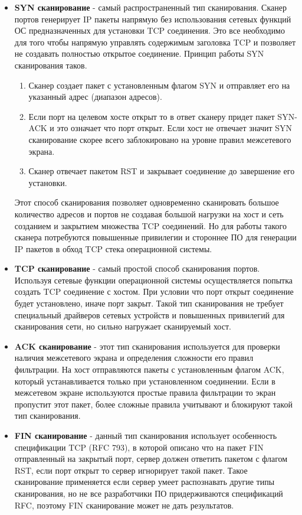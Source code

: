 \begin{itemize}
\item
  \textbf{SYN сканирование} - самый распространенный тип сканирования.
  Сканер портов генерирует IP пакеты напрямую без использования сетевых
  функций ОС предназначенных для установки TCP соединения. Это все
  необходимо для того чтобы напрямую управлять содержимым заголовка TCP
  и позволяет не создавать полностью открытое соединение. Принцип работы
  SYN сканирования таков.

  \begin{enumerate}
  \def\labelenumi{\arabic{enumi}.}
  \item
    Сканер создает пакет с установленным флагом SYN и отправляет его на
    указанный адрес (диапазон адресов).
  \item
    Если порт на целевом хосте открыт то в ответ сканеру придет пакет
    SYN-ACK и это означает что порт открыт. Если хост не отвечает значит
    SYN сканирование скорее всего заблокировано на уровне правил
    межсетевого экрана.
  \item
    Сканер отвечает пакетом RST и закрывает соединение до завершение его
    установки.
  \end{enumerate}

  Этот способ сканирования позволяет одновременно сканировать большое
  количество адресов и портов не создавая большой нагрузки на хост и
  сеть созданием и закрытием множества TCP соединений. Но для работы
  такого сканера потребуются повышенные привилегии и стороннее ПО для
  генерации IP пакетов в обход TCP стека операционной системы.
\item
  \textbf{TCP сканирование} - самый простой способ сканирования портов.
  Используя сетевые функции операционной системы осуществляется попытка
  создать TCP соединение с хостом. При условии что порт открыт
  соединение будет установлено, иначе порт закрыт. Такой тип
  сканирования не требует специальный драйверов сетевых устройств и
  повышенных привилегий для сканирования сети, но сильно нагружает
  сканируемый хост.
\item
  \textbf{ACK сканирование} - этот тип сканирования используется для
  проверки наличия межсетевого экрана и определения сложности его правил
  фильтрации. На хост отправляются пакеты с установленным флагом ACK,
  который устанавливается только при установленном соединении. Если в
  межсетевом экране используются простые правила фильтрации то экран
  пропустит этот пакет, более сложные правила учитывают и блокируют
  такой тип сканирования.
\item
  \textbf{FIN сканирование} - данный тип сканирования использует
  особенность спецификации TCP (RFC 793), в которой описано что на пакет
  FIN отправленный на закрытый порт, сервер должен ответить пакетом с
  флагом RST, если порт открыт то сервер игнорирует такой пакет. Такое
  сканирование применяется если сервер умеет распознавать другие типы
  сканирования, но не все разработчики ПО придерживаются спецификаций
  RFC, поэтому FIN сканирование может не дать результатов.
\end{itemize}

